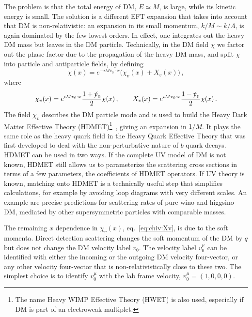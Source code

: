 The problem is that the total energy of DM,  $E\simeq M$, is large, while its kinetic energy is small.
The solution is a different EFT expansion that takes into account that DM is non-relativistic:
an expansion in its small momentum, $k/M\sim k/\Lambda$, is again dominated by the few lowest orders. 
In effect, one integrates out the heavy DM mass but leaves in the DM particle. 
Technically,  in the DM field $\chi$ we factor
out the phase factor due to the propagation of
the heavy DM mass, and split $\chi$ into particle and antiparticle fields, by defining
\begin{equation}\label{eq:chi-field-def}
  \chi (x) = e^{-i M v_0 \cdot x} \big( \chi_v (x) + X_v (x) \big) \,,
\end{equation}
where 
\begin{equation}\label{eq:chiv:Xv}
  \chi_v (x) =  e^{i M v_0 \cdot x} \frac{1 + {\slashed v_0}}{2} \chi
  (x) \,, \qquad X_v (x) = e^{i M v_0 \cdot x} \frac{1 - \slashed
    v_0}{2} \chi (x) \,.
\end{equation}
The field  $\chi_v$ describes the DM particle mode and is used to build the Heavy Dark Matter
Effective Theory (HDMET)\footnote{The name Heavy WIMP Effective Theory (HWET) is also used, especially if DM is part of an electroweak multiplet. }~\cite{HDMET}, giving an expansion
in $1/M$.    It plays the same role as the
heavy quark field in the Heavy Quark Effective Theory \cite{HQET}
that was first developed to deal with the non-perturbative nature of $b$ quark decays. HDMET can be used in two ways. 
If the complete UV model of DM is not known, HDMET still allows us to parameterize the scattering cross sections in terms of a few parameters, the coefficients of HDMET operators. 
If UV theory is known, matching onto HDMET is a technically useful step that simplifies calculations, 
for example by avoiding loop diagrams with very different scales.
An example are precise predictions for scattering rates of pure wino and higgsino DM, mediated by other supersymmetric particles with comparable masses.


The remaining $x$ dependence in $\chi_v(x)$, eq.~\eqref{eq:chiv:Xv}, is due to the soft
momenta. Direct detection scattering changes the soft
momentum of the DM by $q$ but does not change the DM velocity label
$v_0$. The velocity label $v_0^\mu$ can be identified with either the
incoming or the outgoing DM velocity four-vector, or any other velocity
four-vector that is non-relativistically close to these two. The simplest choice is to identify $v_0^\mu$ with the lab frame velocity, $v_0^\mu=(1, 0,0,0)$.



